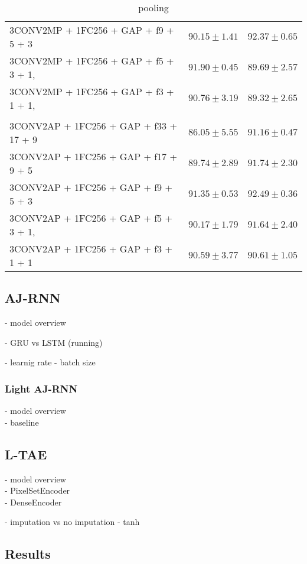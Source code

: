 \begin{table}[!htbp]
\begin{tabular}{lrr}
    3CONV2MP + 1FC256 + GAP + f9 + 5 + 3  	 & $90.15 \pm 1.41$ 	 & $92.37 \pm 0.65$\\
    3CONV2MP + 1FC256 + GAP + f5 + 3 + 1,  	 & $91.90 \pm 0.45$ 	 & $89.69 \pm 2.57$\\
    3CONV2MP + 1FC256 + GAP + f3 + 1 + 1,  	 & $90.76 \pm 3.19$ 	 & $89.32 \pm 2.65$
    \\[0.2cm] \hline \\[-0.2cm]
    3CONV2AP + 1FC256 + GAP + f33 + 17 + 9  	 & $86.05 \pm 5.55$ 	 & $91.16 \pm 0.47$\\
    3CONV2AP + 1FC256 + GAP + f17 + 9 + 5  	 & $89.74 \pm 2.89$ 	 & $91.74 \pm 2.30$\\
    3CONV2AP + 1FC256 + GAP + f9 + 5 + 3  	 & $91.35 \pm 0.53$ 	 & $92.49 \pm 0.36$\\
    3CONV2AP + 1FC256 + GAP + f5 + 3 + 1,  	 & $90.17 \pm 1.79$ 	 & $91.64 \pm 2.40$\\
    3CONV2AP + 1FC256 + GAP + f3 + 1 + 1  	 & $90.59 \pm 3.77$ 	 & $90.61 \pm 1.05$\\
   \end{tabular}
   \caption{pooling}
 \end{table}



\pagebreak
\subsection{AJ-RNN}
- model overview

- GRU vs LSTM (running)

- learnig rate
- batch size 

\subsubsection{Light AJ-RNN}
- model overview\\
- baseline

\subsection{L-TAE}
- model overview\\
- PixelSetEncoder\\
- DenseEncoder

- imputation vs no imputation
- tanh

\subsection{Results}

